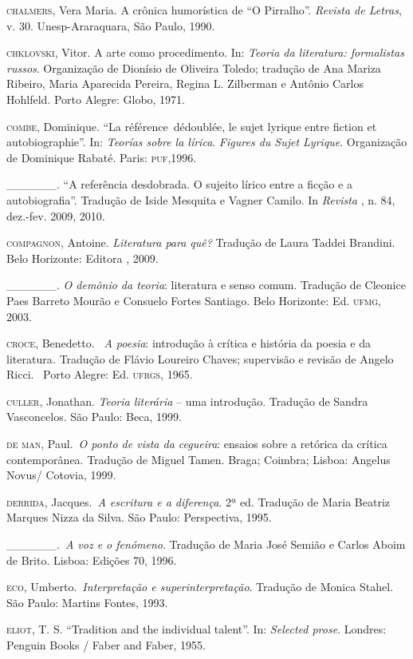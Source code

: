 \begin{Parskip}
\textsc{chalmers}, Vera Maria. A crônica humorística de ``O Pirralho''.
\emph{Revista de Letras}, v. 30. Unesp-Araraquara, São Paulo, 1990.

\textsc{chklovski}, Vitor. A arte como procedimento. In: \emph{Teoria da
literatura: formalistas russos}. Organização de Dionísio de Oliveira
Toledo; tradução de Ana Mariza Ribeiro, Maria Aparecida Pereira, Regina
L. Zilberman e Antônio Carlos Hohlfeld. Porto Alegre: Globo, 1971.

\textsc{combe}, Dominique. ``La référence~dédoublée, le sujet lyrique
entre fiction et autobiographie''. In: \emph{Teorías sobre la lírica}.
\emph{Figures du Sujet Lyrique}. Organização de Dominique Rabaté. Paris:
\textsc{puf},1996.

\_\_\_\_\_\_. ``A referência desdobrada. O sujeito lírico entre a ficção
e a autobiografia''. Tradução de Iside Mesquita e Vagner Camilo. In
\emph{Revista }, n. 84, dez.-fev. 2009, 2010.

\textsc{compagnon}, Antoine. \emph{Literatura para quê?} Tradução de
Laura Taddei Brandini. Belo Horizonte: Editora , 2009.

\_\_\_\_\_\_. \emph{O demônio da teoria}: literatura e senso comum.
Tradução de Cleonice Paes Barreto Mourão e Consuelo Fortes Santiago.
Belo Horizonte: Ed. \textsc{ufmg}, 2003.

\textsc{croce}, Benedetto. \emph{~A poesia}: introdução à crítica e
história da poesia e da literatura\emph{.} Tradução de Flávio Loureiro
Chaves; supervisão e revisão de Angelo Ricci. ~Porto Alegre: Ed.
\textsc{ufrgs}, 1965.

\textsc{culler}, Jonathan. \emph{Teoria literária} -- uma introdução.
Tradução de Sandra Vasconcelos. São Paulo: Beca, 1999.

\textsc{de man}, Paul.~\emph{O ponto de vista da cegueira}: ensaios
sobre a retórica da crítica contemporânea. Tradução de Miguel Tamen.
Braga; Coimbra; Lisboa: Angelus Novus/ Cotovia, 1999.

\textsc{derrida}, Jacques.~\emph{A escritura e a diferença}. 2ª ed.
Tradução de Maria Beatriz Marques Nizza da Silva. São Paulo:
Perspectiva, 1995.

\_\_\_\_\_\_.~\emph{A voz e o fenómeno}. Tradução de Maria José Semião e
Carlos Aboim de Brito. Lisboa: Edições 70, 1996.

\textsc{eco}, Umberto.~\emph{Interpretação e superinterpretação}.
Tradução de Monica Stahel. São Paulo: Martins Fontes, 1993.

\textsc{eliot}, T. S. ``Tradition and the individual talent''. In:
\emph{Selected prose}. Londres: Penguin Books / Faber and Faber, 1955.


\end{Parskip}
